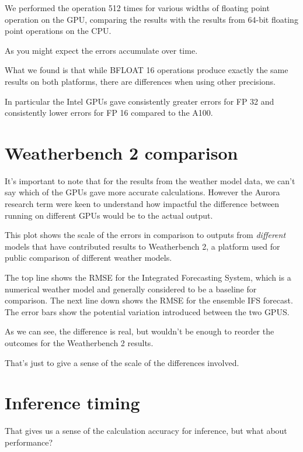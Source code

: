 \documentclass{article}
\begin{document}
We performed the operation 512 times for various widths of floating point operation on the GPU, comparing the results with the results from 64-bit floating point operations on the CPU.

As you might expect the errors accumulate over time.

What we found is that while BFLOAT 16 operations produce exactly the same results on both platforms, there are differences when using other precisions.

In particular the Intel GPUs gave consistently greater errors for FP 32 and consistently lower errors for FP 16 compared to the A100.

\iffalse
\section{Weatherbench 2 comparison}

It's important to note that for the results from the weather model data, we can't say which of the GPUs gave more accurate calculations. However the Aurora research term were keen to understand how impactful the difference between running on different GPUs would be to the actual output.

This plot shows the scale of the errors in comparison to outputs from {\it different} models that have contributed results to Weatherbench 2, a platform used for public comparison of different weather models.

The top line shows the RMSE for the Integrated Forecasting System, which is a numerical weather model and generally considered to be a baseline for comparison. The next line down shows the RMSE for the ensemble IFS forecast. The error bars show the potential variation introduced between the two GPUS.

As we can see, the difference is real, but wouldn't be enough to reorder the outcomes for the Weatherbench 2 results.

That's just to give a sense of the scale of the differences involved.


\section{Inference timing}

That gives us a sense of the calculation accuracy for inference, but what about performance?
\end{document}
